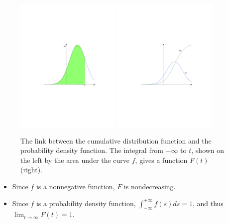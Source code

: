 \begin{figure}[htbp]
\begin{center}
\includegraphics[width=0.45\textwidth]{../figs_03_residence_time/cdf_auc}
\includegraphics[width=0.45\textwidth]{../figs_03_residence_time/cdf_plot}
\caption{The link between the cumulative distribution function and the probability density function. The integral from $-\infty$ to $t$, shown on the left by the area under the curve $f$, gives a function $F(t)$ (right).}
\label{fig:cum_distrib}
\end{center}
\end{figure}
\begin{itemize}
\item
Since $f$ is a nonnegative function, $F$ is nondecreasing.
\item
Since $f$ is a probability density function, $\int_{-\infty}^{+\infty}f(s)ds=1$, and thus $\lim_{t\to\infty}F(t)=1$.
\end{itemize}
\begin{figure}[htbp]
\begin{center}
\end{center}
\end{figure}

